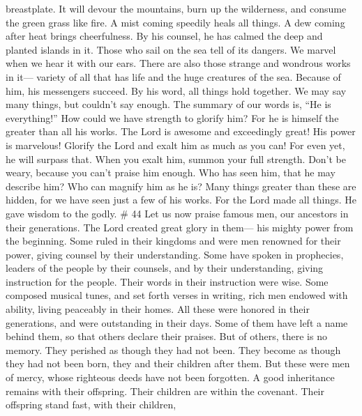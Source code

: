 breastplate.  It will devour the mountains, burn up the
wilderness, and consume the green grass like fire.  A mist
coming speedily heals all things. A dew coming after heat brings
cheerfulness.  By his counsel, he has calmed the deep and
planted islands in it.  Those who sail on the sea tell of
its dangers. We marvel when we hear it with our ears. 
There are also those strange and wondrous works in it--- variety of all
that has life and the huge creatures of the sea.  Because
of him, his messengers succeed. By his word, all things hold together.
 We may say many things, but couldn't say enough. The
summary of our words is, ``He is everything!''  How could
we have strength to glorify him? For he is himself the greater than all
his works.  The Lord is awesome and exceedingly great! His
power is marvelous!  Glorify the Lord and exalt him as much
as you can! For even yet, he will surpass that. When you exalt him,
summon your full strength. Don't be weary, because you can't praise him
enough.  Who has seen him, that he may describe him? Who
can magnify him as he is?  Many things greater than these
are hidden, for we have seen just a few of his works.  For
the Lord made all things. He gave wisdom to the godly. \# 44
 Let us now praise famous men, our ancestors in their
generations.  The Lord created great glory in them--- his
mighty power from the beginning.  Some ruled in their
kingdoms and were men renowned for their power, giving counsel by their
understanding. Some have spoken in prophecies,  leaders of
the people by their counsels, and by their understanding, giving
instruction for the people. Their words in their instruction were wise.
 Some composed musical tunes, and set forth verses in
writing,  rich men endowed with ability, living peaceably in
their homes.  All these were honored in their generations,
and were outstanding in their days.  Some of them have left
a name behind them, so that others declare their praises. 
But of others, there is no memory. They perished as though they had not
been. They become as though they had not been born, they and their
children after them.  But these were men of mercy, whose
righteous deeds have not been forgotten.  A good
inheritance remains with their offspring. Their children are within the
covenant.  Their offspring stand fast, with their children,
